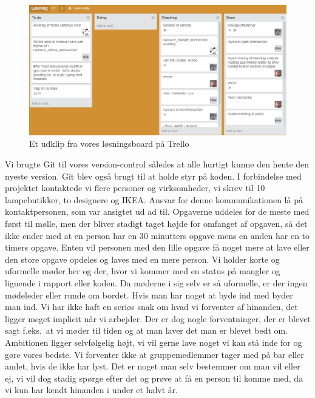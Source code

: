 \documentclass[oneside,a4paper,titlepage]{article}
\begin{document}
\begin{figure}[H]
    \centering
    \includegraphics[width=15cm]{./../graphics/trello}
    \caption{Et udklip fra vores løsningsboard på Trello}
    \label{fig:trello}
\end{figure} 
Vi brugte Git til vores version-control således at alle hurtigt kunne den hente den nyeste version. Git blev også brugt til at holde styr på koden. I forbindelse med projektet kontaktede vi flere personer og virksomheder, vi skrev til 10 lampebutikker, to designere og IKEA. Ansvar for denne kommunikationen lå på kontaktpersonen, som var ansigtet ud ad til. \newline\newline
Opgaverne uddeles for de meste med først til mølle, men der bliver stadigt taget højde for omfanget af opgaven, så det ikke ender med at en person har en 30 minutters opgave mens en anden har en to timers opgave. Enten vil personen med den lille opgave få noget mere at lave eller den store opgave opdeles og laves med en mere person. Vi holder korte og uformelle møder her og der, hvor vi kommer med en status på mangler og lignende i rapport eller koden. Da møderne i sig selv er så uformelle, er der ingen mødeleder eller runde om bordet. Hvis man har noget at byde ind med byder man ind. \newline\newline
Vi har ikke haft en seriøs snak om hvad vi forventer af hinanden, det ligger meget implicit når vi arbejder. Der er dog nogle forventninger, der er blevet sagt f.eks.\ at vi møder til tiden og at man laver det man er blevet bedt om. Ambitionen ligger selvfølgelig højt, vi vil gerne lave noget vi kan stå inde for og gøre vores bedste. Vi forventer ikke at gruppemedlemmer tager med på bar eller andet, hvis de ikke har lyst. Det er noget man selv bestemmer om man vil eller ej, vi vil dog stadig spørge efter det og prøve at få en person til komme med, da vi kun har kendt hinanden i under et halvt år. \newline\newline
\end{document}
